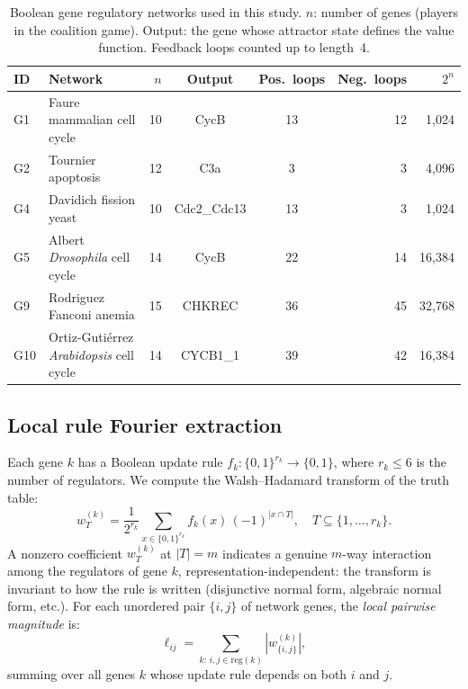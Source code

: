 \documentclass[11pt]{article}
\begin{document}
\begin{table}[t]
\centering
\caption{Boolean gene regulatory networks used in this study. $n$:
number of genes (players in the coalition game). Output: the gene
whose attractor state defines the value function. Feedback loops
counted up to length~4.}
\label{tab:models}
\begin{tabular}{llrccrr}
\toprule
ID & Network & $n$ & Output & Pos.\ loops & Neg.\ loops & $2^n$ \\
\midrule
G1 & Faure mammalian cell cycle & 10 & CycB & 13 & 12 & 1{,}024 \\
G2 & Tournier apoptosis & 12 & C3a & 3 & 3 & 4{,}096 \\
G4 & Davidich fission yeast & 10 & Cdc2\_Cdc13 & 13 & 3 & 1{,}024 \\
G5 & Albert \emph{Drosophila} cell cycle & 14 & CycB & 22 & 14 & 16{,}384 \\
G9 & Rodriguez Fanconi anemia & 15 & CHKREC & 36 & 45 & 32{,}768 \\
G10 & Ortiz-Guti\'errez \emph{Arabidopsis} cell cycle & 14 & CYCB1\_1 & 39 & 42 & 16{,}384 \\
\bottomrule
\end{tabular}
\end{table}


\subsection{Local rule Fourier extraction}
\label{sec:local-fourier}

Each gene $k$ has a Boolean update rule $f_k\colon \{0,1\}^{r_k}
\to \{0,1\}$, where $r_k \leq 6$ is the number of regulators. We
compute the Walsh--Hadamard transform of the truth table:
%
\begin{equation}
\label{eq:local-wht}
w_T^{(k)} = \frac{1}{2^{r_k}} \sum_{x \in \{0,1\}^{r_k}} f_k(x)\,(-1)^{|x \cap T|},
\quad T \subseteq \{1, \ldots, r_k\}.
\end{equation}
%
A nonzero coefficient $w_T^{(k)}$ at $|T| = m$ indicates a genuine
$m$-way interaction among the regulators of gene $k$,
representation-independent: the transform is invariant to how the
rule is written (disjunctive normal form, algebraic normal form, etc.).
For each unordered pair $\{i,j\}$ of network genes, the
\emph{local pairwise magnitude} is:
%
\begin{equation}
\label{eq:local-pair}
\ell_{ij} = \sum_{k:\, i,j \in \mathrm{reg}(k)} |w_{\{i,j\}}^{(k)}|,
\end{equation}
%
summing over all genes $k$ whose update rule depends on both $i$ and
$j$.
\end{document}
